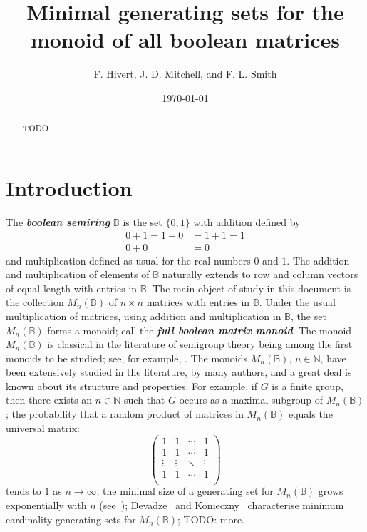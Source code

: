 \documentclass[11pt]{article}
\title{Minimal generating sets for the monoid of all boolean matrices}
\author{F. Hivert, J. D. Mitchell, and F. L. Smith}
\date{\today}
\newcommand{\defn}[1]{\textbf{\textit{#1}}}
\numberwithin{equation}{section}
\renewcommand{\to}{\longrightarrow}
\newcommand{\B}{\mathbb{B}}
\newcommand{\Bn}{M_n(\B)}
\newcommand{\N}{\mathbb{N}}
\begin{document}
\maketitle

\begin{abstract}
  TODO
\end{abstract}

\section{Introduction}


The \defn{boolean semiring} $\B$ is the set $\{0, 1\}$ with addition defined by 
\begin{align*}
  0 + 1 = 1 + 0 &= 1 + 1 = 1 \\
  0 + 0 &= 0
\end{align*}
and multiplication defined as usual for the real numbers $0$ and $1$.  The
addition and multiplication of elements of $\B$ naturally extends to row and
column vectors of equal length with entries in $\B$.  The main object of study
in this document is the collection $\Bn$ of $n\times n$ matrices with entries in
$\B$. Under the usual multiplication of matrices, using addition and
multiplication in $\B$, the set $\Bn$ forms a monoid; call the \defn{full
  boolean matrix monoid}. The monoid $\Bn$ is classical in the literature of
semigroup theory being among the first monoids to be studied; see, for example,
\cite{Zaretskii1963aa}. The monoids $\Bn$, $n\in \N$, have been extensively
studied in the literature, by many authors, and a great deal is known about its
structure and properties. For example, if $G$ is a finite group, then there
exists an $n\in \N$ such that $G$ occurs as a maximal subgroup of $\Bn$; the
probability that a random product of matrices in $\Bn$ equals the universal
matrix:
\begin{equation*} 
  \begin{pmatrix}
  1 & 1 & \cdots & 1\\
  1 & 1 & \cdots & 1\\ 
  \vdots & \vdots & \ddots & \vdots\\
  1 & 1 & \cdots & 1\\ 
\end{pmatrix} 
\end{equation*} 
tends to $1$ as $n\to \infty$; the minimal size of a generating set for $\Bn$
grows exponentially with $n$ (see~);
Devadze~\cite{Devadze1968aa} and Konieczny~\cite{Konieczny2011aa} characterise
minimum cardinality generating sets for $\Bn$; TODO: more.
\end{document}
